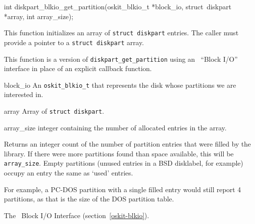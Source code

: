 \begin{apisyn}

        \funcproto int diskpart_blkio_get_partition(oskit_blkio_t *block_io,
			struct~diskpart *array, int array_size);
\end{apisyn}
\begin{apidesc}
        This function initializes an array of {\tt struct~diskpart} entries.
        The caller must provide a pointer to a {\tt struct~diskpart} array.

	This function is a version of \texttt{diskpart_get_partition}
	using an \oskit\ ``Block I/O'' interface in place of an explicit
	callback function.
\end{apidesc}
\begin{apiparm}
	\item[block_io]
		An \texttt{oskit_blkio_t} that represents the disk whose
		partitions we are interested in.
	\item[array]
		Array of {\tt struct~diskpart}.
	\item[array_size]
		integer containing the number of allocated entries in
		the array.
\end{apiparm}
\begin{apiret}
	Returns an integer count of the number of partition entries that were
	filled by the library.  If there were more partitions found than
	space available, this will be {\tt array_size}.
	Empty partitions (unused entries in a BSD disklabel, for example)
	occupy an entry the same as `used' entries.

	For example, a PC-DOS partition with a single filled entry would still
	report 4 partitions, as that is the size of the DOS partition table.
\end{apiret}
\begin{apirel}
	The \oskit\ Block I/O Interface (section~\ref{oskit-blkio}).
\end{apirel}


